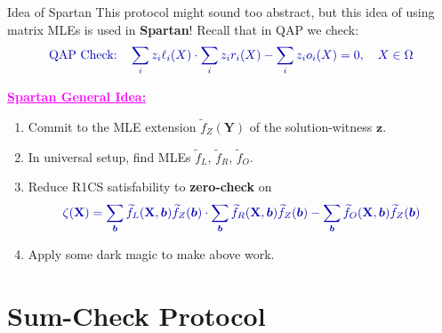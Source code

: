 \documentclass{zkdl-presentation-template}
\begin{document}
    \begin{frame}{Idea of Spartan}
        This protocol might sound too abstract, but this idea of using matrix
        MLEs is used in \textbf{Spartan}! Recall that in QAP we check:
        \begin{equation*}
            \textcolor{blue!70!black}{\text{QAP Check:} \quad \sum_{i}z_i\ell_i(X) \cdot \sum_{i}z_ir_i(X)- \sum_{i}z_io_i(X) = 0, \quad X \in \Omega}
        \end{equation*}

        \vspace{-12.5px}

        \textcolor{magenta}{\underline{\textbf{Spartan General Idea:}}}
        \begin{enumerate}
            \item Commit to the MLE extension $\widetilde{f}_Z(\mathbf{Y})$ of the
            solution-witness $\mathbf{z}$.
            \item In universal setup, find MLEs $\widetilde{f}_L$, $\widetilde{f}_R$, $\widetilde{f}_O$.
            \item Reduce R1CS satisfability to \textbf{zero-check} on
            \begin{equation*}
                \textcolor{blue!70!black}{\zeta(\mathbf{X}) = \sum_{\boldsymbol{b}}\widetilde{f}_L(\mathbf{X},\boldsymbol{b})\widetilde{f}_Z(\boldsymbol{b}) \cdot \sum_{\boldsymbol{b}}\widetilde{f}_R(\mathbf{X},\boldsymbol{b})\widetilde{f}_Z(\boldsymbol{b}) - \sum_{\boldsymbol{b}}\widetilde{f}_O(\mathbf{X},\boldsymbol{b})\widetilde{f}_Z(\boldsymbol{b})}
            \end{equation*}
            \item Apply some dark magic to make above work.
        \end{enumerate}
    \end{frame}

    \section{Sum-Check Protocol}
\end{document}
